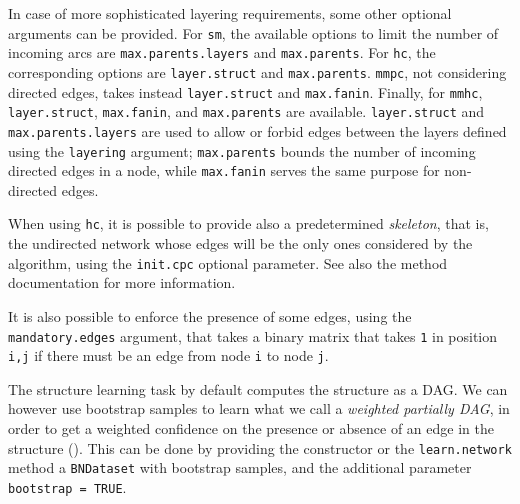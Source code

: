 \documentclass{article}\usepackage[]{graphicx}\usepackage[]{color}
\newcommand{\Robject}[1]{{\texttt{#1}}}
\newcommand{\Rmethod}[1]{{\texttt{#1}}}
\newcommand{\Rfunarg}[1]{{\texttt{#1}}}
\begin{document}
In case of more sophisticated layering requirements, some other optional arguments can be provided.
For \Rfunarg{sm}, the available options to limit the number of incoming arcs are \Rfunarg{max.parents.layers} and \Rfunarg{max.parents}.
For \Rfunarg{hc}, the corresponding options are \Rfunarg{layer.struct} and \Rfunarg{max.parents}.
\Rfunarg{mmpc}, not considering directed edges, takes instead \Rfunarg{layer.struct} and \Rfunarg{max.fanin}.
Finally, for \Rfunarg{mmhc}, \Rfunarg{layer.struct}, \Rfunarg{max.fanin}, and \Rfunarg{max.parents} are available.
\Rfunarg{layer.struct} and \Rfunarg{max.parents.layers} are used to allow or forbid edges between the layers defined using the \Rfunarg{layering} argument; \Rfunarg{max.parents} bounds the number of incoming directed edges in a node, while \Rfunarg{max.fanin} serves the same purpose for non-directed edges.

When using \Rfunarg{hc}, it is possible to provide also a predetermined \textit{skeleton}, that is, the undirected network whose edges will be the only ones
considered by the algorithm, using the \Rfunarg{init.cpc} optional parameter.
See also the method documentation for more information.

It is also possible to enforce the presence of some edges, using the \Rfunarg{mandatory.edges} argument,
that takes a binary matrix that takes \texttt{1} in position \texttt{i,j} if there must be an edge
from node \texttt{i} to node \texttt{j}.

The structure learning task by default computes the structure as a DAG. We can however use
bootstrap samples to learn what we call a \textit{weighted partially DAG}, in order to get a weighted confidence on the presence or
absence of an edge in the structure (\citet*{friedman1999data}). This can be done by providing the constructor or the \Rmethod{learn.network}
method a \Robject{BNDataset} with bootstrap samples, and the additional parameter \Rfunarg{bootstrap = TRUE}.
\end{document}
